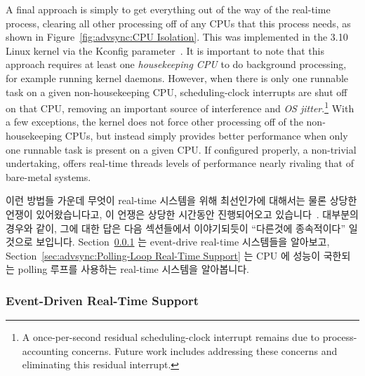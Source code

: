 A final approach is simply to get everything out of the way of the
real-time process, clearing all other processing off of any CPUs that
this process needs, as shown in Figure~\ref{fig:advsync:CPU Isolation}.
This was implemented in the 3.10 Linux kernel via the 
Kconfig parameter~\cite{FredericWeisbecker2013nohz}.
It is important to note that this approach requires at least one
\emph{housekeeping CPU} to do background processing, for example running
kernel daemons.
However, when there is only one runnable task on a given non-housekeeping CPU,
scheduling-clock interrupts are shut off on that CPU, removing an important
source of interference and \emph{OS jitter}.\footnote{
	A once-per-second residual scheduling-clock interrupt remains
	due to process-accounting concerns.
	Future work includes addressing these concerns and eliminating
	this residual interrupt.}
With a few exceptions, the kernel does not force other processing off of the
non-housekeeping CPUs, but instead simply provides better performance
when only one runnable task is present on a given CPU.
If configured properly, a non-trivial undertaking, 
offers real-time threads levels of performance nearly rivaling that of
bare-metal systems.
\fi

이런 방법들 가운데 무엇이 real-time 시스템을 위해 최선인가에 대해서는 물론
상당한 언쟁이 있어왔습니다고, 이 언쟁은 상당한 시간동안 진행되어오고
있습니다~\cite{JonCorbet2004RealTimeLinuxPart1,JonCorbet2004RealTimeLinuxPart2}.
대부분의 경우와 같이, 그에 대한 답은 다음 섹션들에서 이야기되듯이 ``다른것에
종속적이다'' 일 것으로 보입니다.
Section~\ref{sec:advsync:Event-Driven Real-Time Support} 는 event-drive
real-time 시스템들을 알아보고,
Section~\ref{sec:advsync:Polling-Loop Real-Time Support} 는 CPU 에 성능이
국한되는 polling 루프를 사용하는 real-time 시스템을 알아봅니다.

\subsubsection{Event-Driven Real-Time Support}
\label{sec:advsync:Event-Driven Real-Time Support}


